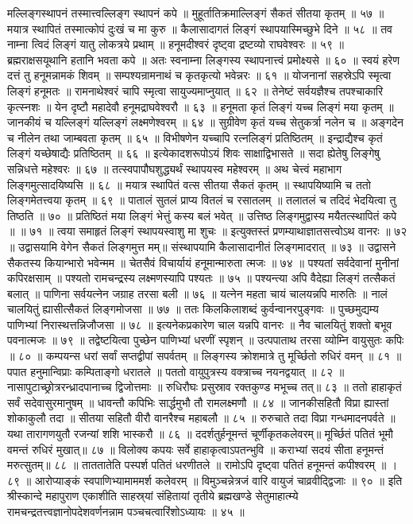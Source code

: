 मल्लिङ्गस्थापनं तस्मात्त्वल्लिङ्ग स्थापनं कपे ॥
मुहूर्तातिक्रमाल्लिङ्गं सैकतं सीतया कृतम् ॥ ५७ ॥
मयात्र स्थापितं तस्मात्कोपं दुःखं च मा कुरु ॥
कैलासादागतं लिङ्गं स्थापयास्मिच्छुभे दिने ॥ ५८ ॥
तव नाम्ना त्विदं लिङ्गं यातु लोकत्रये प्रथाम् ॥
हनूमदीश्वरं दृष्ट्वा द्रष्टव्यो राघवेश्वरः ॥ ५९ ॥
ब्रह्मराक्षसयूथानि हतानि भवता कपे ॥
अतः स्वनाम्ना लिङ्गस्य स्थापनात्त्वं प्रमोक्ष्यसे ॥ ६० ॥
स्वयं हरेण दत्तं तु हनूमन्नामकं शिवम् ॥
सम्पश्यन्रामनाथं च कृतकृत्यो भवेन्नरः ॥ ६१ ॥
योजनानां सहस्रेऽपि स्मृत्वा लिङ्गं हनूमतः ॥
रामनाथेश्वरं चापि स्मृत्वा सायुज्यमाप्नुयात् ॥ ६२ ॥
तेनेष्टं सर्वयज्ञैश्च तपश्चाकारि कृत्स्नशः ॥
येन दृष्टौ महादेवौ हनूमद्राघवेश्वरौ ॥ ६३ ॥
हनूमता कृतं लिङ्गं यच्च लिङ्गं मया कृतम् ॥
जानकीयं च यल्लिङ्गं यल्लिङ्गं लक्ष्मणेश्वरम् ॥ ६४ ॥
सुग्रीवेण कृतं यच्च सेतुकर्त्रा नलेन च ॥
अङ्गदेन च नीलेन तथा जाम्बवता कृतम् ॥ ६५ ॥
विभीषणेन यच्चापि रत्नलिङ्गं प्रतिष्ठितम् ॥
इन्द्राद्यैश्च कृतं लिङ्गं यच्छेषाद्यैः प्रतिष्ठितम् ॥ ६६ ॥
इत्येकादशरूपोऽयं शिवः साक्षाद्विभासते ॥
सदा ह्येतेषु लिङ्गेषु सन्निधत्ते महेश्वरः ॥ ६७ ॥
तत्स्वपापौघशुद्ध्यर्थं स्थापयस्व महेश्वरम् ॥
अथ चेत्त्वं महाभाग लिङ्गमुत्सादयिष्यसि ॥ ६८ ॥
मयात्र स्थापितं वत्स सीतया सैकतं कृतम् ॥
स्थापयिष्यामि च ततो लिङ्गमेतत्त्वया कृतम् ॥ ६९ ॥
पातालं सुतलं प्राप्य वितलं च रसातलम् ॥
तलातलं च तदिदं भेदयित्वा तु तिष्ठति ॥ ७० ॥
प्रतिष्ठितं मया लिङ्गं भेत्तुं कस्य बलं भवेत् ॥
उत्तिष्ठ लिङ्गमुद्वास्य मयैतत्स्थापितं कपे ॥ ॥ ७१ ॥
त्वया समाहृतं लिङ्गं स्थापयस्वाशु मा शुचः ॥
इत्युक्तस्तं प्रणम्याथाज्ञातसत्त्वोऽथ वानरः ॥ ७२ ॥
उद्वासयामि वेगेन सैकतं लिङ्गमुत्त मम्॥
संस्थापयामि कैलासादानीतं लिङ्गमादरात् ॥ ७३ ॥
उद्वासने सैकतस्य कियान्भारो भवेन्मम ॥
चेतसैवं विचार्यायं हनूमान्मारुता त्मजः ॥ ७४ ॥
पश्यतां सर्वदेवानां मुनीनां कपिरक्षसाम् ॥
पश्यतो रामचन्द्रस्य लक्ष्मणस्यापि पश्यतः ॥ ७५ ॥
पश्यन्त्या अपि वैदेह्या लिङ्गं तत्सैकतं बलात् ॥
पाणिना सर्वयत्नेन जग्राह तरसा बली ॥ ७६ ॥
यत्नेन महता चायं चालयन्नपि मारुतिः ॥
नालं चालयितुं ह्यासीत्सैकतं लिङ्गमोजसा ॥ ७७ ॥
ततः किलकिलाशब्दं कुर्वन्वानरपुङ्गवः ॥
पुच्छमुद्यम्य पाणिभ्यां निरास्थत्तन्निजौजसा ॥ ७८ ॥
इत्यनेकप्रकारेण चाल यन्नपि वानरः ॥
नैव चालयितुं शक्तो बभूव पवनात्मजः ॥ ७९ ॥
तद्वेष्टयित्वा पुच्छेन पाणिभ्यां धरणीं स्पृशन् ॥
उत्पपाताथ तरसा व्योम्नि वायुसुतः कपिः ॥ ८० ॥
कम्पयन्स धरां सर्वां सप्तद्वीपां सपर्वतम् ॥
लिङ्गस्य क्रोशमात्रे तु मूर्च्छितो रुधिरं वमन् ॥ ८१ ॥
पपात हनुमान्विप्राः कम्पिताङ्गो धरातले ॥
पततो वायुपुत्रस्य वक्त्राच्च नयनद्वयात् ॥ ८२ ॥
नासापुटाच्छ्रोत्ररन्ध्रादपानाच्च द्विजोत्तमाः ॥
रुधिरौघः प्रसुस्राव रक्तकुण्ड मभूच्च तत्॥ ८३ ॥
ततो हाहाकृतं सर्वं सदेवासुरमानुषम् ॥
धावन्तौ कपिभिः सार्द्धमुभौ तौ रामलक्ष्मणौ ॥ ८४ ॥
जानकीसहितौ विप्रा ह्यास्तां शोकाकुलौ तदा ॥
सीतया सहितौ वीरौ वानरैश्च महाबलौ ॥ ८५ ॥
रुरुचाते तदा विप्रा गन्धमादनपर्वते ॥
यथा तारागणयुतौ रजन्यां शशि भास्करौ ॥ ८६ ॥
ददर्शतुर्हनूमन्तं चूर्णीकृतकलेवरम्॥
मूर्च्छितं पतितं भूमौ वमन्तं रुधिरं मुखात्॥ ८७ ॥
विलोक्य कपयः सर्वे हाहाकृत्वाऽपतन्भुवि ॥
कराभ्यां सदयं सीता हनूमन्तं मरुत्सुतम्॥ ८८ ॥
ताततातेति पस्पर्श पतितं धरणीतले ॥
रामोऽपि दृष्ट्वा पतितं हनूमन्तं कपीश्वरम् ॥ । ८९ ॥
आरोप्याङ्कं स्वपाणिभ्यामाममर्श कलेवरम् ॥
विमुञ्चन्नेत्रजं वारि वायुजं चाव्रवीद्द्विजाः ॥ ९० ॥
इति श्रीस्कान्दे महापुराण एकाशीति साहस्र्यां संहितायां तृतीये ब्रह्मखण्डे सेतुमाहात्म्ये रामचन्द्रतत्त्वज्ञानोपदेशवर्णनन्नाम पञ्चचत्वारिंशोऽध्यायः ॥ ४५ ॥


